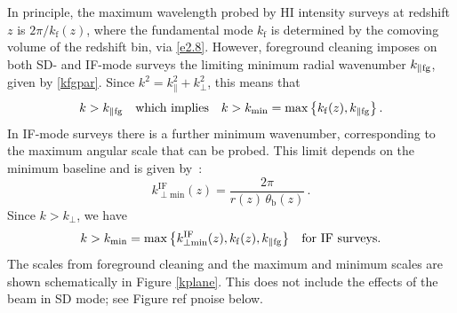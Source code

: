 In principle, the maximum wavelength probed by HI intensity surveys at redshift $z$ is $2\pi/k_\mathrm{f}(z)$,  
where the fundamental mode $k_\mathrm{f}$ is determined by the comoving volume of the redshift bin, via \eqref{e2.8}. 
However, foreground cleaning imposes on both SD- and IF-mode surveys the  limiting minimum radial wavenumber $k_{\|\mathrm{fg}}$, given by \eqref{kfgpar}. Since $k^2=k_\|^2+k_\perp^2$, this means that  
\begin{equation} \label{eq:kmin}
k>k_{\|\mathrm{fg}} \quad \mbox{which implies}\quad k >  k_\mathrm{min}= \mathrm{max}\,\big\{ k_\mathrm{f}(z), k_{\|\mathrm{fg}} \big\}\,.
\end{equation}
In IF-mode surveys there is a further minimum wavenumber, corresponding to the maximum angular scale that can be probed. This limit depends on the minimum baseline and is given by~\cite{Bull:2014rha,Alonso:2017dgh,Karagiannis:2019jjx,Durrer:2020orn}:
\begin{equation} \label{kifmin}
k_{\perp \mathrm{min}}^{\mathrm{IF}}(z) = \frac{2\pi}{r(z)\,\theta_{\mathrm{b}}(z)}\,.
\end{equation}
Since $k>k_\perp$, we have
\begin{equation} \label{kminif}
k > k_\mathrm{min} = \mathrm{max}\,\big\{ k_{\perp \mathrm{min}}^{\mathrm{IF}}(z), k_\mathrm{f}(z), k_{\|\mathrm{fg}} \big\} \quad \mbox{for IF surveys}.
\end{equation}
The scales from foreground cleaning and the maximum and minimum scales are shown schematically in Figure \ref{kplane}. This does not include the effects of the beam in SD mode; 
see Figure ref pnoise below.
%
%
